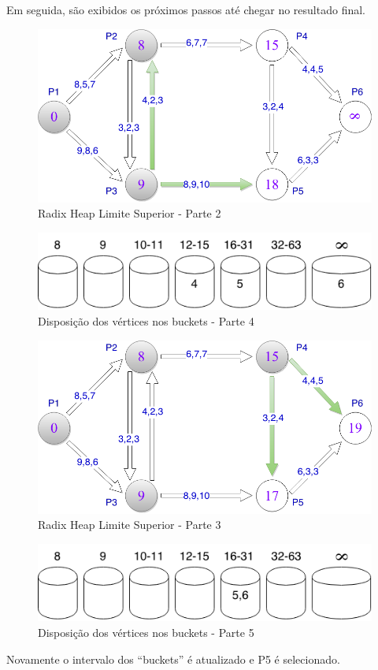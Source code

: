 Em seguida, são exibidos os próximos passos até chegar no resultado final.

\begin{figure}[htbp]
\centering
 \includegraphics[width=.50\textwidth]{chapters/fig/limitesup2.png}
\caption{Radix Heap Limite Superior - Parte 2}
\label{fig:limitesup2}
\end{figure}

\begin{figure}[htbp]
\centering
 \includegraphics[width=.50\textwidth]{chapters/fig/buckets4.png}
\caption{Disposição dos vértices nos buckets - Parte 4}
\label{fig:buckets4}
\end{figure}

\begin{figure}[htbp]
\centering
 \includegraphics[width=.50\textwidth]{chapters/fig/limitesup3.png}
\caption{Radix Heap Limite Superior - Parte 3}
\label{fig:limitesup3}
\end{figure}

\begin{figure}[htbp]
\centering
 \includegraphics[width=.50\textwidth]{chapters/fig/buckets5.png}
\caption{Disposição dos vértices nos buckets - Parte 5}
\label{fig:buckets5}
\end{figure}
\FloatBarrier

Novamente o intervalo dos ``buckets'' é atualizado e P5 é selecionado.

